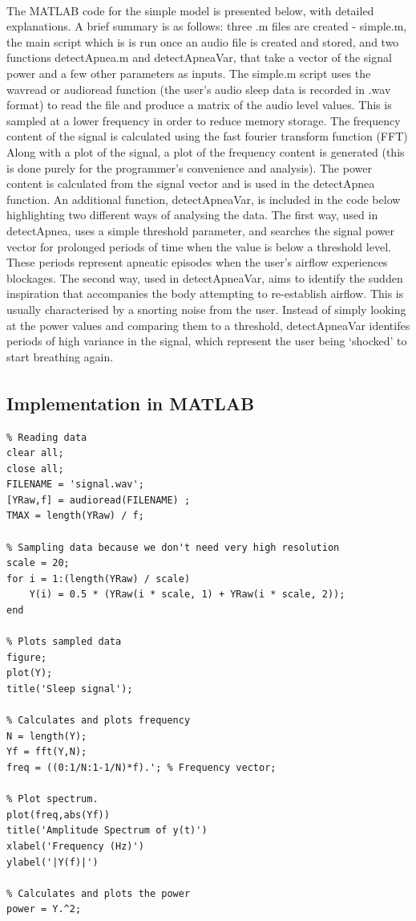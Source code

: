 The MATLAB\textsuperscript{\textregistered{}} code for the simple model is presented below, with detailed explanations. A brief summary is as follows: three .m files are created - simple.m, the main script which is is run once an audio file is created and stored, and  two functions detectApnea.m and detectApneaVar, that take a vector of the signal power and a few other parameters as inputs. The simple.m script uses the wavread or audioread function (the user's audio sleep data is recorded in .wav format) to read the file and produce a matrix of the audio level values. This is sampled at a lower frequency in order to reduce memory storage. The frequency content of the signal is calculated using the fast fourier transform function (FFT) Along with a plot of the signal, a plot of the frequency content is generated (this is done purely for the programmer's convenience and analysis). The power content is calculated from the signal vector and is used in the detectApnea function. An additional function, detectApneaVar, is included in the code below highlighting two different ways of analysing the data. The first way, used in detectApnea, uses a simple threshold parameter, and searches the signal power vector for prolonged periods of time when the value is below a threshold level. These periods represent apneatic episodes when the user's airflow experiences blockages. The second way, used in detectApneaVar, aims to identify the sudden inspiration that accompanies the body attempting to re-establish airflow. This is usually characterised by a snorting noise from the user. Instead of simply looking at the power values and comparing them to a threshold, detectApneaVar identifes periods of high variance in the signal, which represent the user being `shocked' to start breathing again.

\subsection{Implementation in MATLAB\textsuperscript{\textregistered{}}}

\begin{lstlisting} 
% Reading data
clear all;
close all;
FILENAME = 'signal.wav';
[YRaw,f] = audioread(FILENAME) ;
TMAX = length(YRaw) / f;

% Sampling data because we don't need very high resolution
scale = 20;
for i = 1:(length(YRaw) / scale)
    Y(i) = 0.5 * (YRaw(i * scale, 1) + YRaw(i * scale, 2));
end

% Plots sampled data
figure;
plot(Y);
title('Sleep signal');

% Calculates and plots frequency
N = length(Y);
Yf = fft(Y,N);
freq = ((0:1/N:1-1/N)*f).'; % Frequency vector;

% Plot spectrum.
plot(freq,abs(Yf)) 
title('Amplitude Spectrum of y(t)')
xlabel('Frequency (Hz)')
ylabel('|Y(f)|')

% Calculates and plots the power
power = Y.^2;
\end{lstlisting}

